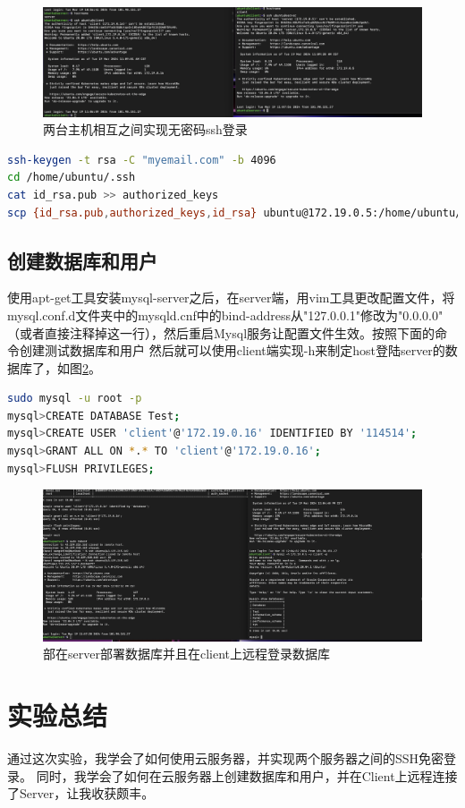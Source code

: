 \documentclass{article}
\begin{document}
\begin{figure}
    \centering
    \includegraphics[width=1.0\textwidth]{no_pwd_login.png}
    \caption{两台主机相互之间实现无密码ssh登录}
    \label{fig:3}
\end{figure}
\begin{lstlisting}[language=bash]
ssh-keygen -t rsa -C "myemail.com" -b 4096
cd /home/ubuntu/.ssh
cat id_rsa.pub >> authorized_keys
scp {id_rsa.pub,authorized_keys,id_rsa} ubuntu@172.19.0.5:/home/ubuntu/.ssh
\end{lstlisting}
\subsection{创建数据库和用户}
使用apt-get工具安装mysql-server之后，在server端，用vim工具更改配置文件，将mysql.conf.d文件夹中的mysqld.cnf中的bind-address从"127.0.0.1"修改为"0.0.0.0"
（或者直接注释掉这一行），然后重启Mysql服务让配置文件生效。按照下面的命令创建测试数据库和用户
然后就可以使用client端实现-h来制定host登陆server的数据库了，如图\ref{fig:4}。
\begin{lstlisting}[language=bash]
sudo mysql -u root -p
mysql>CREATE DATABASE Test;
mysql>CREATE USER 'client'@'172.19.0.16' IDENTIFIED BY '114514';
mysql>GRANT ALL ON *.* TO 'client'@'172.19.0.16';
mysql>FLUSH PRIVILEGES;
\end{lstlisting}
\begin{figure}[H]
    \centering
    \includegraphics[width=1.0\textwidth]{deploy_mysql.png}
    \caption{部在server部署数据库并且在client上远程登录数据库}
    \label{fig:4}
\end{figure}
\section{实验总结}
\indent 通过这次实验，我学会了如何使用云服务器，并实现两个服务器之间的SSH免密登录。
同时，我学会了如何在云服务器上创建数据库和用户，并在Client上远程连接了Server，让我收获颇丰。
\end{document}
